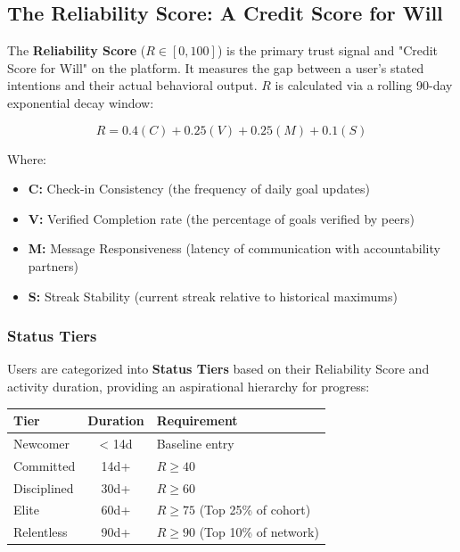 \documentclass[11pt,a4paper]{article}
\begin{document}
\subsection{The Reliability Score: A Credit Score for Will}

The \textbf{Reliability Score} ($R \in [0, 100]$) is the primary trust signal and "Credit Score for Will" on the platform. It measures the gap between a user's stated intentions and their actual behavioral output. $R$ is calculated via a rolling 90-day exponential decay window:

\begin{equation}
R = 0.4(C) + 0.25(V) + 0.25(M) + 0.1(S)
\end{equation}

Where:
\begin{itemize}
    \item \textbf{C:} Check-in Consistency (the frequency of daily goal updates)
    \item \textbf{V:} Verified Completion rate (the percentage of goals verified by peers)
    \item \textbf{M:} Message Responsiveness (latency of communication with accountability partners)
    \item \textbf{S:} Streak Stability (current streak relative to historical maximums)
\end{itemize}

\subsubsection{Status Tiers}

Users are categorized into \textbf{Status Tiers} based on their Reliability Score and activity duration, providing an aspirational hierarchy for progress:

\begin{center}
\begin{tabular}{lcl}
\toprule
\textbf{Tier} & \textbf{Duration} & \textbf{Requirement} \\
\midrule
Newcomer & < 14d & Baseline entry \\
Committed & 14d+ & $R \geq 40$ \\
Disciplined & 30d+ & $R \geq 60$ \\
Elite & 60d+ & $R \geq 75$ (Top 25\% of cohort) \\
Relentless & 90d+ & $R \geq 90$ (Top 10\% of network) \\
\bottomrule
\end{tabular}
\end{center}
\end{document}

